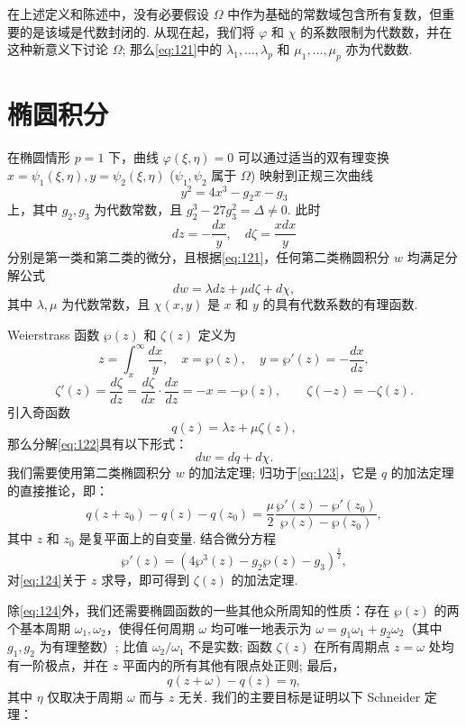 在上述定义和陈述中，没有必要假设 $\Omega$ 中作为基础的常数域包含所有复数，但重要的是该域是代数封闭的. 从现在起，我们将 $\varphi$ 和 $\chi$ 的系数限制为代数数，并在这种新意义下讨论 $\Omega$; 那么\eqref{eq:121}中的 $\lambda_1, \dots, \lambda_p$ 和 $\mu_1, \dots, \mu_p$ 亦为代数数.

\section{椭圆积分}\label{sec:4.2}

在椭圆情形 $p=1$ 下，曲线 $\varphi(\xi, \eta) = 0$ 可以通过适当的双有理变换 $x = \psi_1(\xi, \eta), y = \psi_2(\xi, \eta)$ ($\psi_1, \psi_2$ 属于 $\Omega$) 映射到正规三次曲线
\[
y^2 = 4x^3 - g_2 x - g_3
\]
上，其中 $g_2, g_3$ 为代数常数，且 $g_2^3 - 27g_3^2 = \Delta \neq 0$. 此时
\[
dz = -\frac{dx}{y}, \quad d\zeta = \frac{x dx}{y}
\]
分别是第一类和第二类的微分，且根据\eqref{eq:121}，任何第二类椭圆积分 $w$ 均满足分解公式
\begin{equation}
dw = \lambda dz + \mu d\zeta + d\chi, \tag{122}\label{eq:122}
\end{equation}
其中 $\lambda, \mu$ 为代数常数，且 $\chi(x, y)$ 是 $x$ 和 $y$ 的具有代数系数的有理函数.

Weierstrass 函数 $\wp(z)$ 和 $\zeta(z)$ 定义为
\[
z = \int_{x}^{\infty} \frac{dx}{y}, \quad x = \wp(z), \quad y = \wp'(z) = -\frac{dx}{dz},
\]
\[
\zeta'(z) = \frac{d\zeta}{dz} = \frac{d\zeta}{dx} \cdot \frac{dx}{dz} = -x = -\wp(z), \qquad \zeta(-z) = -\zeta(z).
\]
引入奇函数
\[
q(z) = \lambda z + \mu \zeta(z),
\]
那么分解\eqref{eq:122}具有以下形式：
\begin{equation}
dw = dq + d\chi. \tag{123}\label{eq:123}
\end{equation}
我们需要使用第二类椭圆积分 $w$ 的加法定理; 归功于\eqref{eq:123}，它是 $q$ 的加法定理的直接推论，即：
\begin{equation}
q(z+z_0) - q(z) - q(z_0) = \frac{\mu}{2} \frac{\wp'(z) - \wp'(z_0)}{\wp(z) - \wp(z_0)}, \tag{124}\label{eq:124}
\end{equation}
其中 $z$ 和 $z_0$ 是复平面上的自变量. 结合微分方程
\[
\wp'(z) = \left(4 \wp^3(z) - g_2 \wp(z) - g_3\right)^{\frac{1}{2}},
\]
对\eqref{eq:124}关于 $z$ 求导，即可得到 $\zeta(z)$ 的加法定理.

除\eqref{eq:124}外，我们还需要椭圆函数的一些其他众所周知的性质：存在 $\wp(z)$ 的两个基本周期 $\omega_1, \omega_2$，使得任何周期 $\omega$ 均可唯一地表示为 $\omega = g_1 \omega_1 + g_2 \omega_2$（其中 $g_1, g_2$ 为有理整数）; 比值 $\omega_2 / \omega_1$ 不是实数; 函数 $\zeta(z)$ 在所有周期点 $z = \omega$ 处均有一阶极点，并在 $z$ 平面内的所有其他有限点处正则; 最后，
\begin{equation}
q(z+\omega) - q(z) = \eta, \tag{125}\label{eq:125}
\end{equation}
其中 $\eta$ 仅取决于周期 $\omega$ 而与 $z$ 无关. 我们的主要目标是证明以下 Schneider 定理：

